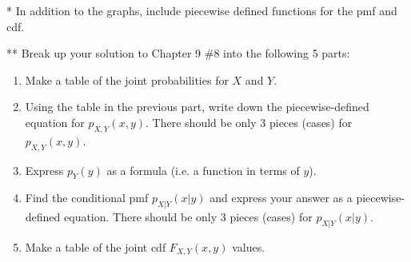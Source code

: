 \documentclass[12pt]{article}
\begin{document}
%
%
%


* In addition to the graphs, include piecewise defined functions for the pmf and cdf.


** Break up your solution to Chapter 9 \#8 into the following 5 parts:
	\begin{enumerate}
	\item Make a table of the joint probabilities for $X$ and $Y$.
	\item Using the table in the previous part, write down the piecewise-defined equation for $p_{X,Y}(x,y)$. There should be only 3 pieces (cases) for $p_{X,Y}(x,y)$.
	\item Express $p_Y(y)$ as a formula (i.e. a function in terms of $y$). 
	\item Find the conditional pmf $p_{X|Y}(x|y)$ and express your answer as a piecewise-defined equation. There should be only 3 pieces (cases) for $p_{X|Y}(x|y)$.
	\item Make a table of the joint cdf $F_{X,Y}(x,y)$ values.
	\end{enumerate}




\end{document}
